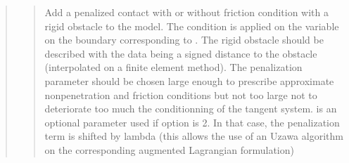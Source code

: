 \documentclass[a4paper,11pt,english]{sphinxmanual}
\begin{document}
\begin{quote}
\sphinxAtStartPar
{}
\begin{quote}

\sphinxAtStartPar
Add a penalized contact with or without friction condition with a
rigid obstacle to the model.
The condition is applied on the variable 
on the boundary corresponding to . The rigid obstacle should
be described with the data  being a signed distance to
the obstacle (interpolated on a finite element method).
The penalization parameter  should be chosen
large enough to prescribe approximate non\sphinxhyphen{}penetration and friction
conditions but not too large not to deteriorate too much the
conditionning of the tangent system.
 is an optional parameter used if option
is 2. In that case, the penalization term is shifted by lambda (this
allows the use of an Uzawa algorithm on the corresponding augmented
Lagrangian formulation)
\end{quote}

\sphinxAtStartPar
{}
\begin{quote}


\end{quote}
\end{quote}
\end{document}

